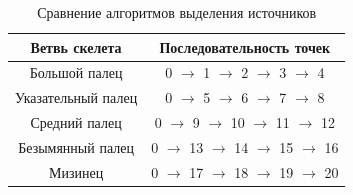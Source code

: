 \begin{table}[h]
	\caption{\label{tab:keypoints_skeleton}Сравнение алгоритмов выделения источников}
	\begin{center}
		\begin{tabular}{|c|c|}
			\hline
			Ветвь скелета & Последовательность точек \\
			\hline
			Большой палец & 0 $\rightarrow$ 1 $\rightarrow$ 2 $\rightarrow$ 3 $\rightarrow$ 4 \\
			Указательный палец & 0 $\rightarrow$ 5 $\rightarrow$ 6 $\rightarrow$ 7 $\rightarrow$ 8 \\
			Средний палец & 0 $\rightarrow$ 9 $\rightarrow$ 10 $\rightarrow$ 11 $\rightarrow$ 12 \\
			Безымянный палец & 0 $\rightarrow$ 13 $\rightarrow$ 14 $\rightarrow$ 15 $\rightarrow$ 16 \\
			Мизинец & 0 $\rightarrow$ 17 $\rightarrow$ 18 $\rightarrow$ 19 $\rightarrow$ 20 \\
			\hline
		\end{tabular}
	\end{center}
\end{table} 